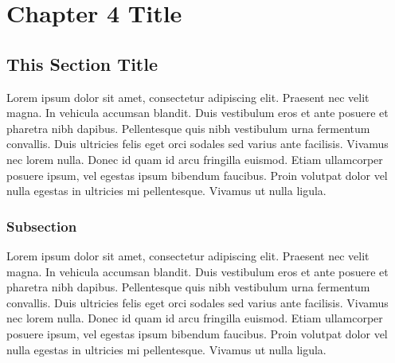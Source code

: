 \chapter{Chapter 4 Title}
\label{sec:chap4}
\thispagestyle{myheadings}

\section{This Section Title}
\label{sec:thissec}

Lorem ipsum dolor sit amet, consectetur adipiscing elit. Praesent nec velit magna. In vehicula accumsan blandit. Duis vestibulum eros et ante posuere et pharetra nibh dapibus. Pellentesque quis nibh vestibulum urna fermentum convallis. Duis ultricies felis eget orci sodales sed varius ante facilisis. Vivamus nec lorem nulla. Donec id quam id arcu fringilla euismod. Etiam ullamcorper posuere ipsum, vel egestas ipsum bibendum faucibus. Proin volutpat dolor vel nulla egestas in ultricies mi pellentesque. Vivamus ut nulla ligula. 


\subsection{Subsection}
\label{sec:subsec}

Lorem ipsum dolor sit amet, consectetur adipiscing elit. Praesent nec velit magna. In vehicula accumsan blandit. Duis vestibulum eros et ante posuere et pharetra nibh dapibus. Pellentesque quis nibh vestibulum urna fermentum convallis. Duis ultricies felis eget orci sodales sed varius ante facilisis. Vivamus nec lorem nulla. Donec id quam id arcu fringilla euismod. Etiam ullamcorper posuere ipsum, vel egestas ipsum bibendum faucibus. Proin volutpat dolor vel nulla egestas in ultricies mi pellentesque. Vivamus ut nulla ligula. 